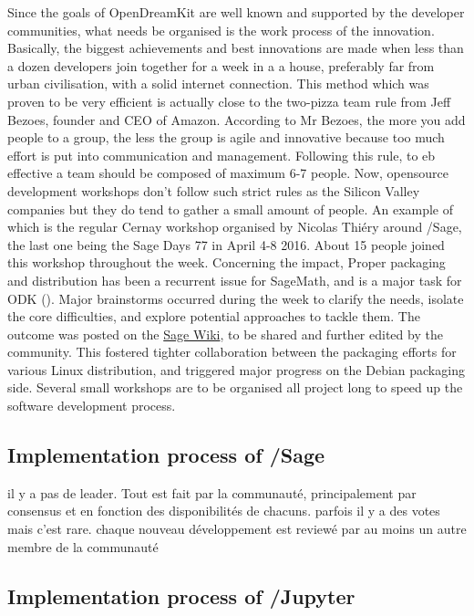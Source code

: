 \documentclass{deliverablereport}
\begin{document}
Since the goals of OpenDreamKit are well known and supported by the developer communities, what needs be organised is the work process of the innovation. Basically, the biggest achievements and best innovations are made when less than a dozen developers join together for a week in a a house, preferably far from urban civilisation, with a solid internet connection. This method which was proven to be very efficient is actually close to the two-pizza team rule from Jeff Bezoes, founder and CEO of Amazon. According to Mr Bezoes, the more you add people to a group, the less the group is agile and innovative because too much effort is put into communication and management. Following this rule, to eb effective a team should be composed of maximum 6-7 people.
Now, opensource development workshops don't follow such strict rules as the Silicon Valley companies but they do tend to gather a small amount of people. An example of which is the regular Cernay workshop organised by Nicolas Thiéry around /Sage, the last one being the Sage Days 77 in April 4-8 2016. About 15 people joined this workshop throughout the week. Concerning the impact, Proper packaging and distribution has been a recurrent issue for SageMath, and is a major task for ODK (). Major brainstorms occurred during the week to clarify the needs, isolate the core difficulties, and explore potential approaches to tackle them. The outcome was posted on the \href{https://wiki.sagemath.org/days77/packaging}{Sage Wiki}, to be shared and further edited by the community. This fostered tighter collaboration between the packaging efforts for various Linux distribution, and triggered major progress on the Debian packaging side.
Several small workshops are to be organised all project long to speed up the software development process.

\subsection{Implementation process of /Sage}
il y a pas de leader. Tout est fait par la communauté, principalement par consensus et en fonction des disponibilités de chacuns. parfois il y a des votes mais c'est rare. chaque nouveau développement est reviewé par au moins un autre membre de la communauté
\subsection{Implementation process of /Jupyter}
\end{document}
